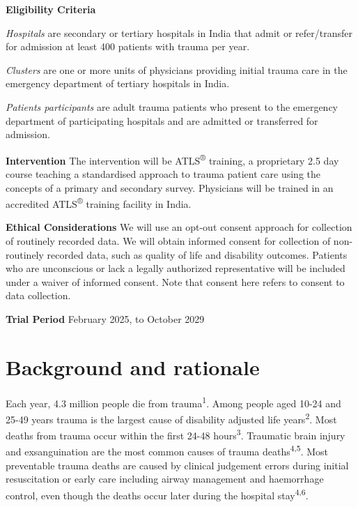 \documentclass[
]{scrartcl}
\begin{document}
\textbf{Eligibility Criteria}

\emph{Hospitals} are secondary or tertiary hospitals in India that admit
or refer/transfer for admission at least 400 patients with trauma per
year.

\emph{Clusters} are one or more units of physicians providing initial
trauma care in the emergency department of tertiary hospitals in India.

\emph{Patients participants} are adult trauma patients who present to
the emergency department of participating hospitals and are admitted or
transferred for admission.

\textbf{Intervention} The intervention will be ATLS\textsuperscript{®}
training, a proprietary 2.5 day course teaching a standardised approach
to trauma patient care using the concepts of a primary and secondary
survey. Physicians will be trained in an accredited
ATLS\textsuperscript{®} training facility in India.

\textbf{Ethical Considerations} We will use an opt-out consent approach
for collection of routinely recorded data. We will obtain informed
consent for collection of non-routinely recorded data, such as quality
of life and disability outcomes. Patients who are unconscious or lack a
legally authorized representative will be included under a waiver of
informed consent. Note that consent here refers to consent to data
collection.

\textbf{Trial Period} February 2025, to October 2029

\newpage{}

\hypertarget{background-and-rationale}{%
\section{Background and rationale}\label{background-and-rationale}}

Each year, 4.3 million people die from trauma\textsuperscript{1}. Among
people aged 10-24 and 25-49 years trauma is the largest cause of
disability adjusted life years\textsuperscript{2}. Most deaths from
trauma occur within the first 24-48 hours\textsuperscript{3}. Traumatic
brain injury and exsanguination are the most common causes of trauma
deaths\textsuperscript{4,5}. Most preventable trauma deaths are caused
by clinical judgement errors during initial resuscitation or early care
including airway management and haemorrhage control, even though the
deaths occur later during the hospital stay\textsuperscript{4,6}.
\end{document}
